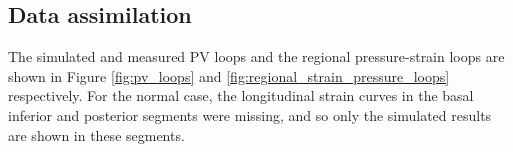 

\subsection{Data assimilation}

The simulated and measured PV loops and the regional
pressure-strain loops are shown in Figure \ref{fig:pv_loops} and
\ref{fig:regional_strain_pressure_loops} respectively. 
For the normal case, the longitudinal strain curves in the basal
inferior and posterior segments were missing, and so only the
simulated results are shown in these segments.

